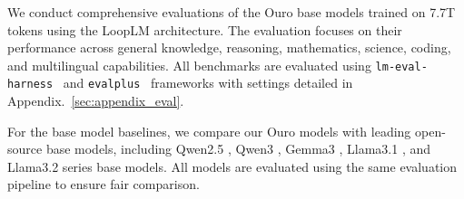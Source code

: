 \documentclass[]{bytedance_seed}
\newcommand{\1}{\mathbf{1}}
\newcommand{\ut}{LoopLM}
\begin{document}
We conduct comprehensive evaluations of the Ouro base models trained on 7.7T tokens using the \ut{} architecture. The evaluation focuses on their performance across general knowledge, reasoning, mathematics, science, coding, and multilingual capabilities. All benchmarks are evaluated using \texttt{lm-eval-harness}~\citep{eval-harness} and \texttt{evalplus}~\citep{evalplus} frameworks with settings detailed in Appendix.~\ref{sec:appendix_eval}.

For the base model baselines, we compare our Ouro models with leading open-source base models, including Qwen2.5 \citep{qwen2}, Qwen3 \citep{qwen3}, Gemma3 \citep{team2025gemma3}, Llama3.1 \citep{dubey2024llama}, and Llama3.2 \citep{dubey2024llama} series base models. All models are evaluated using the same evaluation pipeline to ensure fair comparison.
\end{document}
